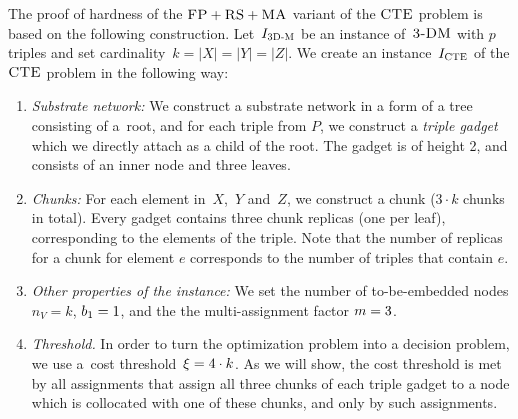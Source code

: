 The proof of hardness of the $\textsc{FP}+\textsc{RS}+\textsc{MA}$ variant of the $\textsc{CTE}$ problem is based on the following construction.
Let~$I_{\mathrm{\textsc{3D-M}}}$ be an instance of~$\textsc{3-DM}$ with $p$ triples and set cardinality~${k = |X| = |Y| = |Z|}$.
We create an instance~$I_{\mathrm{\textsc{CTE}}}$ of the $\textsc{CTE}$ problem in the following way:
\begin{enumerate}
\item \emph{Substrate network:} We construct a substrate network in a form of a tree consisting of a~root,
and for each triple from $P$, we construct a \emph{triple gadget} which we directly attach as
a child of the root. The gadget is of height 2,
and consists of an inner node and three leaves.
\item \emph{Chunks:} For each element in~$X$,~$Y$ and~$Z$,
 we construct a chunk
($3 \cdot k$ chunks in total). Every gadget contains three chunk replicas (one per leaf),
corresponding to the elements of the triple.
Note that the number of replicas for a chunk for element $e$ corresponds to the number of triples that contain $e$.
\item \emph{Other properties of the instance:} We set the number of to-be-embedded nodes $n_V = k$,
$b_1 = 1$, and the the multi-assignment factor
$m=3$.
\item \emph{Threshold.} In order to turn the optimization problem into a decision problem, we use
a~cost threshold~$\xi = 4\cdot k$. As we will show, the cost threshold is met by all
assignments that assign all three chunks of each triple gadget to a
node which is collocated with one of these chunks, and only by such assignments.
\end{enumerate}

%


